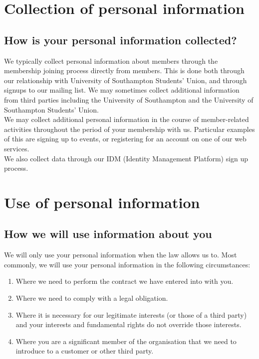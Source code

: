 \documentclass[12pt]{article}
\begin{document}
\section{Collection of personal information}

\subsection{How is your personal information collected?}

We typically collect personal information about members through the membership joining process directly from members. This is done both through our relationship with University of Southampton Students' Union, and through signups to our mailing list. We may sometimes collect additional information from third parties including the University of Southampton and the University of Southampton Students’ Union.\\
We may collect additional personal information in the course of member-related activities throughout the period of your membership with us. Particular examples of this are signing up to events, or registering for an account on one of our web services.\\
We also collect data through our IDM (Identity Management Platform) sign up process.

\section{Use of personal information}


\subsection{How we will use information about you}
We will only use your personal information when the law allows us to. Most commonly, we will use your personal information in the following circumstances:

\begin{enumerate}
\item Where we need to perform the contract we have entered into with you.
\item Where we need to comply with a legal obligation.
\item Where it is necessary for our legitimate interests (or those of a third party) and your interests and fundamental rights do not override those interests. 
\item Where you are a significant member of the organisation that we need to introduce to a customer or other third party.
\end{enumerate}
\end{document}
